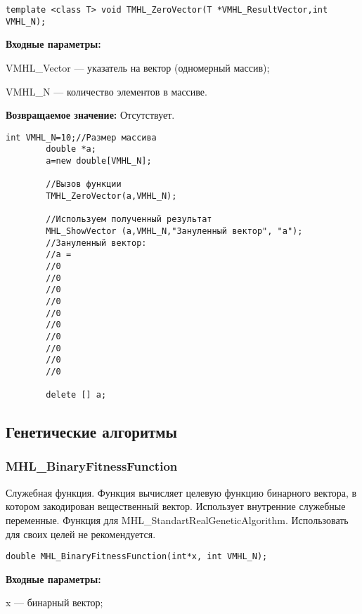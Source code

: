 \documentclass[a4paper,12pt]{article}
\begin{document}
\begin{lstlisting}[label=code_syntax_TMHL_ZeroVector,caption=Синтаксис]
template <class T> void TMHL_ZeroVector(T *VMHL_ResultVector,int VMHL_N);
\end{lstlisting}

\textbf{Входные параметры:}

 VMHL\_Vector --- указатель на вектор (одномерный массив);
 
 VMHL\_N --- количество элементов в массиве.

\textbf{Возвращаемое значение:}
Отсутствует.


\begin{lstlisting}[label=code_use_TMHL_ZeroVector,caption=Пример использования]
        int VMHL_N=10;//Размер массива
        double *a;
        a=new double[VMHL_N];

        //Вызов функции
        TMHL_ZeroVector(a,VMHL_N);

        //Используем полученный результат
        MHL_ShowVector (a,VMHL_N,"Зануленный вектор", "a");
        //Зануленный вектор:
        //a =
        //0
        //0
        //0
        //0
        //0
        //0
        //0
        //0
        //0
        //0

        delete [] a;
\end{lstlisting}

\subsection{Генетические алгоритмы}

\subsubsection{MHL\_BinaryFitnessFunction}\label{MHL_BinaryFitnessFunction}

Служебная функция. Функция вычисляет целевую функцию бинарного вектора, в котором закодирован вещественный вектор. Использует внутренние служебные переменные. Функция для MHL\_StandartRealGeneticAlgorithm. Использовать для своих целей не рекомендуется.


\begin{lstlisting}[label=code_syntax_MHL_BinaryFitnessFunction,caption=Синтаксис]
double MHL_BinaryFitnessFunction(int*x, int VMHL_N);
\end{lstlisting}

\textbf{Входные параметры:}
 
x --- бинарный вектор;
\end{document}
